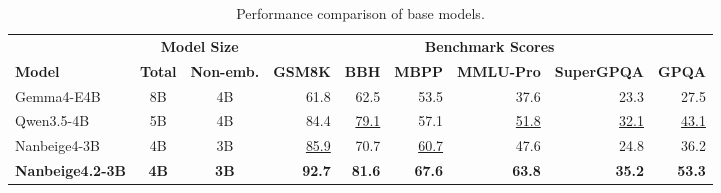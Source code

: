 \begin{table}[t]
    \centering
    \caption{Performance comparison of base models. 
    }
    \label{tab:pretrain_results}
    \small
    \setlength{\tabcolsep}{4pt}
    \renewcommand{\arraystretch}{1.05}
    \begin{tabular}{lccrrrrrr}
        \toprule
        & \multicolumn{2}{c}{\textbf{Model Size}}
        & \multicolumn{6}{c}{\textbf{Benchmark Scores}} \\
        \cmidrule(lr){2-3}
        \cmidrule(lr){4-9}
        \textbf{Model}
        & \textbf{Total}
        & \textbf{Non-emb.}
        & \textbf{GSM8K}
        & \textbf{BBH}
        & \textbf{MBPP}
        & \textbf{MMLU-Pro}
        & \textbf{SuperGPQA}
        & \textbf{GPQA} \\
        \midrule
        Gemma4-E4B
            & 8B & 4B
            & 61.8 & 62.5 & 53.5 & 37.6 & 23.3 & 27.5 \\
        Qwen3.5-4B
            & 5B & 4B
            & 84.4 & \underline{79.1} & 57.1
            & \underline{51.8} & \underline{32.1} & \underline{43.1} \\
        Nanbeige4-3B
            & 4B & 3B
            & \underline{85.9} & 70.7 & \underline{60.7}
            & 47.6 & 24.8 & 36.2 \\
        \midrule
        \textbf{Nanbeige4.2-3B}
            & \textbf{4B} & \textbf{3B}
            & \textbf{92.7} & \textbf{81.6} & \textbf{67.6}
            & \textbf{63.8} & \textbf{35.2} & \textbf{53.3} \\
        \bottomrule
    \end{tabular}
\end{table}
